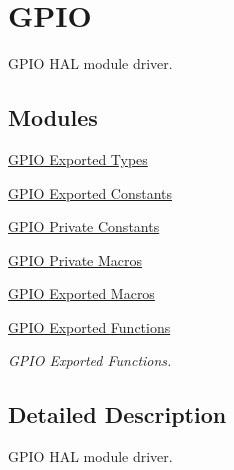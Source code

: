 \hypertarget{group___g_p_i_o}{\section{G\-P\-I\-O}
\label{group___g_p_i_o}
}


G\-P\-I\-O H\-A\-L module driver.  


\subsection*{Modules}
\begin{DoxyCompactItemize}
\item 
\hyperlink{group___g_p_i_o___exported___types}{G\-P\-I\-O Exported Types}
\item 
\hyperlink{group___g_p_i_o___exported___constants}{G\-P\-I\-O Exported Constants}
\item 
\hyperlink{group___g_p_i_o___private___constants}{G\-P\-I\-O Private Constants}
\item 
\hyperlink{group___g_p_i_o___private___macros}{G\-P\-I\-O Private Macros}
\item 
\hyperlink{group___g_p_i_o___exported___macros}{G\-P\-I\-O Exported Macros}
\item 
\hyperlink{group___g_p_i_o___exported___functions}{G\-P\-I\-O Exported Functions}
\begin{DoxyCompactList}\small\item\em G\-P\-I\-O Exported Functions. \end{DoxyCompactList}\end{DoxyCompactItemize}


\subsection{Detailed Description}
G\-P\-I\-O H\-A\-L module driver. 